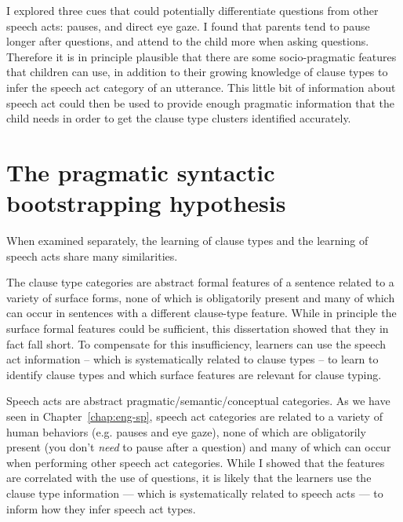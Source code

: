 I explored three cues that could potentially differentiate questions from other speech acts: pauses, and direct eye gaze. I found that parents tend to pause longer after questions, and attend to the child more when asking questions. Therefore it is in principle plausible that there are some socio-pragmatic features that children can use, in addition to their growing knowledge of clause types to infer the speech act category of an utterance. This little bit of information about speech act could then be used to provide enough pragmatic information that the child needs in order to get the clause type clusters identified accurately.

\section{The pragmatic syntactic bootstrapping hypothesis}

When examined separately, the learning of clause types and the learning of speech acts share many similarities. 


The clause type categories are abstract formal features of a sentence related to a variety of surface forms, none of which is obligatorily present and many of which can occur in sentences with a different clause-type feature. While in principle the surface formal features could be sufficient, this dissertation showed that they in fact fall short. To compensate for this insufficiency, learners can use the speech act information -- which is systematically related to clause types -- to learn to identify clause types and which surface features are relevant for clause typing.

Speech acts are abstract pragmatic/semantic/conceptual categories. As we have seen in Chapter~\ref{chap:eng-sp}, speech act categories are related to a variety of human behaviors (e.g. pauses and eye gaze), none of which are obligatorily present (you don't \emph{need} to pause after a question) and many of which can occur when performing other speech act categories. While I showed that the features are correlated with the use of questions, it is likely that the learners use the clause type information --- which is systematically related to speech acts --- to inform how they infer speech act types.

